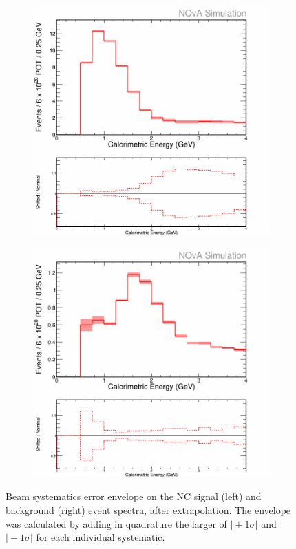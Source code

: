 \begin{figure}[h]
  \centering
  \begin{subfigure}{.48\textwidth}
    \centering
    \includegraphics[width=1\linewidth]{figures/cNCEXBeamSysts.png}
  \end{subfigure}
  \begin{subfigure}{.48\textwidth}
    \centering
    \includegraphics[width=1\linewidth]{figures/cBGEXBeamSysts.png}
  \end{subfigure}
  \caption[Beam Systematic Error Envelopes]{Beam systematics error envelope on the NC signal (left) and background (right) event spectra, after extrapolation. The envelope was calculated by adding in quadrature the larger of $\vert +1\sigma \vert$ and $\vert -1\sigma \vert$ for each individual systematic.}
  \label{fig:SystBeam}
\end{figure}

